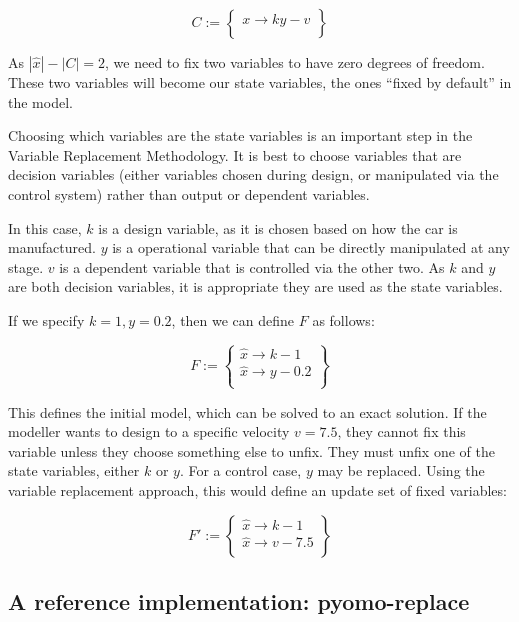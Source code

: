 \[
C :=
\begin{Bmatrix}
x \to ky - v\\
\end{Bmatrix}
\]

As \(|\hat{x}| - |C| = 2\), we need to fix two variables to have zero
degrees of freedom. These two variables will become our state variables,
the ones ``fixed by default'' in the model.

Choosing which variables are the state variables is an important step in
the Variable Replacement Methodology. It is best to choose variables
that are decision variables (either variables chosen during design, or
manipulated via the control system) rather than output or dependent
variables.

In this case, \(k\) is a design variable, as it is chosen based on how
the car is manufactured. \(y\) is a operational variable that can be
directly manipulated at any stage. \(v\) is a dependent variable that is
controlled via the other two. As \(k\) and \(y\) are both decision
variables, it is appropriate they are used as the state variables.

If we specify \(k = 1, y = 0.2\), then we can define \(F\) as follows:

\[
F :=
\begin{Bmatrix}
\hat{x} \to k - 1 \\
\hat{x} \to y - 0.2  \\
\end{Bmatrix}
\]

This defines the initial model, which can be solved to an exact
solution. If the modeller wants to design to a specific velocity
\(v = 7.5\), they cannot fix this variable unless they choose something
else to unfix. They must unfix one of the state variables, either \(k\)
or \(y\). For a control case, \(y\) may be replaced. Using the variable
replacement approach, this would define an update set of fixed
variables:

\[
F' :=
\begin{Bmatrix}
\hat{x} \to k - 1 \\
\hat{x} \to v - 7.5  \\
\end{Bmatrix}
\]

\hypertarget{a-reference-implementation-pyomo-replace}{%
\subsection{A reference implementation:
pyomo-replace}\label{a-reference-implementation-pyomo-replace}}

